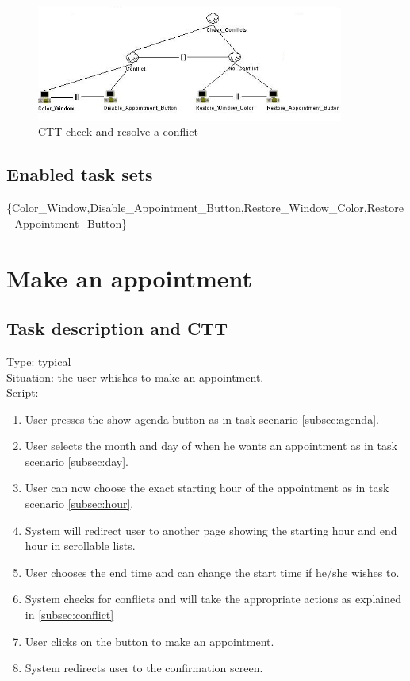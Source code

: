 \documentclass[11pt, a4paper,svglistings]{report}
\begin{document}
\begin{figure}[H]
\centering
    \includegraphics[width=0.9\textwidth]{CheckConflicts.png}
  \caption[Check conflict CTT]{\label{fig:CheckConflict}CTT check and resolve a conflict}
\end{figure}

\subsection{Enabled task sets}

\{Color\_Window,Disable\_Appointment\_Button,Restore\_Window\_Color,Restore\_Appointment\_Button\}


\newpage

\section{Make an appointment}

\subsection{Task description and CTT}

\label{subsec:appointment}Type: typical \\
Situation: the user whishes to make an appointment. \\
Script:
\begin{enumerate}
\item User presses the show agenda button as in task scenario \ref{subsec:agenda}.
\item User selects the month and day of when he wants an appointment as in task scenario \ref{subsec:day}.
\item User can now choose the exact starting hour of the appointment as in task scenario \ref{subsec:hour}.
\item System will redirect user to another page showing the starting hour and end hour in scrollable lists.
\item User chooses the end time and can change the start time if he/she wishes to.
\item System checks for conflicts and will take the appropriate actions as explained in \ref{subsec:conflict}
\item User clicks on the button to make an appointment.
\item System redirects user to the confirmation screen.
\end{enumerate}
\end{document}
